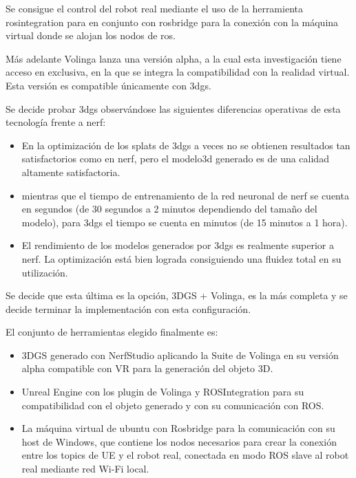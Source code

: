 \documentclass[a4paper, 12pt, spanish, twoside]{article}
\begin{document}
Se consigue el control del robot real mediante el uso de la herramienta \gls{rosintegration} para  en conjunto con \gls{rosbridge} para la conexión con la máquina virtual donde se alojan los nodos de \acrshort{ros}. 

Más adelante Volinga lanza una versión alpha, a la cual esta investigación tiene acceso en exclusiva, en la que se integra la compatibilidad con la realidad virtual. Esta versión es compatible únicamente con \acrshort{3dgs}. 

Se decide probar \acrshort{3dgs} observándose las siguientes diferencias operativas de esta tecnología frente a \acrshort{nerf}: 

\begin{itemize}
\item En la optimización de los splats de \acrshort{3dgs} a veces no se obtienen resultados tan satisfactorios como en \acrshort{nerf}, pero el \gls{modelo3d} generado es de una calidad altamente satisfactoria. 

\item mientras que el tiempo de entrenamiento de la red neuronal de \acrshort{nerf} se cuenta en segundos (de 30 segundos a 2 minutos dependiendo del tamaño del modelo), para \acrshort{3dgs} el tiempo se cuenta en minutos (de 15 minutos a 1 hora). 

\item El rendimiento de los modelos generados por \acrshort{3dgs} es realmente superior a \gls{nerf}. La optimización está bien lograda consiguiendo una fluidez total en su utilización. 
\end{itemize} 

Se decide que esta última es la opción, 3DGS + Volinga, es la más completa y se decide terminar la implementación con esta configuración. 

El conjunto de herramientas elegido finalmente es: 

\begin{itemize} 
\item 3DGS generado con NerfStudio aplicando la Suite de Volinga en su versión alpha compatible con VR para la generación del objeto 3D. 

\item Unreal Engine con los plugin de Volinga y ROSIntegration para su compatibilidad con el objeto generado y con su comunicación con ROS. 

\item La máquina virtual de ubuntu con Rosbridge para la comunicación con su host de Windows, que contiene los nodos necesarios para crear la conexión entre los topics de UE y el robot real, conectada en modo ROS slave al robot real mediante red Wi-Fi local. 
\end{itemize} 
\end{document}
